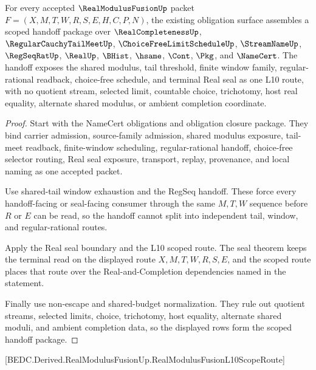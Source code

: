 \begin{theorem}
\label{thm:real-modulus-fusion-scoped-handoff-package}
For every accepted $\RealModulusFusionUp$ packet
$F=(X,M,T,W,R,S,E,H,C,P,N)$, the existing obligation surface assembles a
scoped handoff package over $\RealCompletenessUp$,
$\RegularCauchyTailMeetUp$, $\ChoiceFreeLimitScheduleUp$, $\StreamNameUp$,
$\RegSeqRatUp$, $\RealUp$, $\BHist$, $\hsame$, $\Cont$, $\Pkg$, and
$\NameCert$. The handoff exposes the shared modulus, tail threshold, finite
window family, regular-rational readback, choice-free schedule, and terminal
Real seal as one L10 route, with no quotient stream, selected limit, countable
choice, trichotomy, host real equality, alternate shared modulus, or ambient
completion coordinate.
\end{theorem}
\begin{proof}
Start with the NameCert obligations and obligation closure package. They bind
carrier admission, source-family admission, shared modulus exposure, tail-meet
readback, finite-window scheduling, regular-rational handoff, choice-free
selector routing, Real seal exposure, transport, replay, provenance, and local
naming as one accepted packet.

Use shared-tail window exhaustion and the RegSeq handoff. These force every
handoff-facing or seal-facing consumer through the same $M,T,W$ sequence
before $R$ or $E$ can be read, so the handoff cannot split into independent
tail, window, and regular-rational routes.

Apply the Real seal boundary and the L10 scoped route. The seal theorem keeps
the terminal read on the displayed route $X,M,T,W,R,S,E$, and the scoped route
places that route over the Real-and-Completion dependencies named in the
statement.

Finally use non-escape and shared-budget normalization. They rule out quotient
streams, selected limits, choice, trichotomy, host equality, alternate shared
moduli, and ambient completion data, so the displayed rows form the scoped
handoff package.
\end{proof}

[BEDC.Derived.RealModulusFusionUp.RealModulusFusionL10ScopeRoute]

